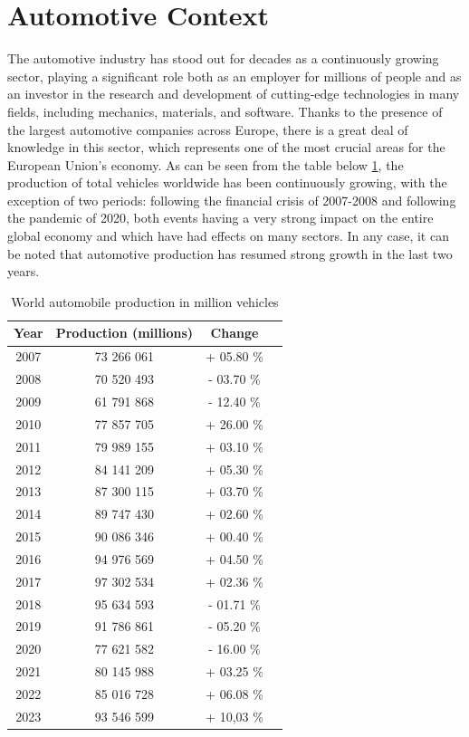 \section{Automotive Context}
The automotive industry has stood out for decades as a continuously growing sector, playing a significant role both as an employer for millions of people and as an investor in the research and development of cutting-edge technologies in many fields, including mechanics, materials, and software. Thanks to the presence of the largest automotive companies across Europe, there is a great deal of knowledge in this sector, which represents one of the most crucial areas for the European Union's economy. As can be seen from the table below \ref{tab:VehicleProduction}, the production of total vehicles worldwide has been continuously growing, with the exception of two periods: following the financial crisis of 2007-2008 and following the pandemic of 2020, both events having a very strong impact on the entire global economy and which have had effects on many sectors. In any case, it can be noted that automotive production has resumed strong growth in the last two years.

\begin{table}[htbp]
  \centering
  \caption{World automobile production in million vehicles \cite{automotiveInCentralEurope}}
  \label{tab:VehicleProduction}
  \begin{tabular}{cccc}
    \toprule
    Year & Production (millions) & Change \\
    \midrule
    2007 & 73 266 061 & + 05.80 \% \\
    2008 & 70 520 493 & - 03.70 \% \\
    2009 & 61 791 868 & - 12.40 \% \\
    2010 & 77 857 705 & + 26.00 \% \\
    2011 & 79 989 155 & + 03.10 \% \\
    2012 & 84 141 209 & + 05.30 \% \\
    2013 & 87 300 115 & + 03.70 \% \\
    2014 & 89 747 430 & + 02.60 \% \\
    2015 & 90 086 346 & + 00.40 \% \\
    2016 & 94 976 569 & + 04.50 \% \\
    2017 & 97 302 534 & + 02.36 \% \\
    2018 & 95 634 593 & - 01.71 \% \\
    2019 & 91 786 861 & - 05.20 \% \\
    2020 & 77 621 582 & - 16.00 \% \\
    2021 & 80 145 988 & + 03.25 \% \\
    2022 & 85 016 728 & + 06.08 \% \\
    2023 & 93 546 599 & + 10,03 \% \\
  \bottomrule
  \end{tabular}
\end{table}

